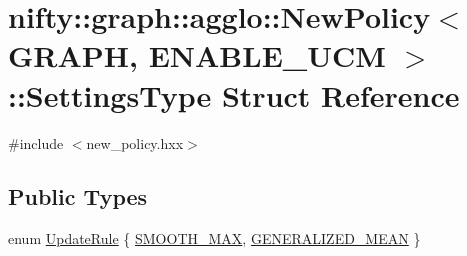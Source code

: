 \hypertarget{structnifty_1_1graph_1_1agglo_1_1NewPolicy_1_1SettingsType}{}\section{nifty\+:\+:graph\+:\+:agglo\+:\+:New\+Policy$<$ G\+R\+A\+PH, E\+N\+A\+B\+L\+E\+\_\+\+U\+CM $>$\+:\+:Settings\+Type Struct Reference}
\label{structnifty_1_1graph_1_1agglo_1_1NewPolicy_1_1SettingsType}


{\ttfamily \#include $<$new\+\_\+policy.\+hxx$>$}

\subsection*{Public Types}
\begin{DoxyCompactItemize}
\item 
enum \hyperlink{structnifty_1_1graph_1_1agglo_1_1NewPolicy_1_1SettingsType_accfaea9de6fc67aab372340c1982edcd}{Update\+Rule} \{ \hyperlink{structnifty_1_1graph_1_1agglo_1_1NewPolicy_1_1SettingsType_accfaea9de6fc67aab372340c1982edcdaf7163c17d1baa4a4818ae5f4e2f7d605}{S\+M\+O\+O\+T\+H\+\_\+\+M\+AX}, 
\hyperlink{structnifty_1_1graph_1_1agglo_1_1NewPolicy_1_1SettingsType_accfaea9de6fc67aab372340c1982edcda2bbcc33cf0052f0d9dcf29bb93a804b0}{G\+E\+N\+E\+R\+A\+L\+I\+Z\+E\+D\+\_\+\+M\+E\+AN}
 \}
\end{DoxyCompactItemize}
